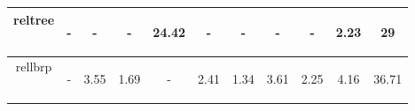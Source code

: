 \documentclass{article}
\begin{document}
\begin{table}[H]
\begin{center}
\begin{tabular}{|c|c|c|c|c|c|c|c|c|c|c|}
				    reltree & \begin{footnotesize}-\end{footnotesize} & \begin{footnotesize}-\end{footnotesize} & \begin{footnotesize}-\end{footnotesize} & \begin{footnotesize}24.42\end{footnotesize} & \begin{footnotesize}-\end{footnotesize} & \begin{footnotesize}-\end{footnotesize} & \begin{footnotesize}-\end{footnotesize} & \begin{footnotesize}-\end{footnotesize} & \begin{footnotesize}2.23\end{footnotesize} & \begin{footnotesize}29\end{footnotesize}\\ \hline
   				    rellbrp & \begin{footnotesize}-\end{footnotesize} & \begin{footnotesize}3.55\end{footnotesize} & \begin{footnotesize}1.69\end{footnotesize} & \begin{footnotesize}-\end{footnotesize} & \begin{footnotesize}2.41\end{footnotesize} & \begin{footnotesize}1.34\end{footnotesize} & \begin{footnotesize}3.61\end{footnotesize} & \begin{footnotesize}2.25\end{footnotesize} & \begin{footnotesize}4.16\end{footnotesize} & \begin{footnotesize}36.71\end{footnotesize}\\ \hline

\end{tabular}
\end{center}
\end{table}
\end{document}
